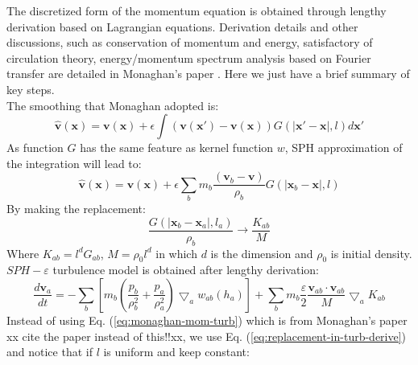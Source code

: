 \documentclass[journal abbreviation, manuscript]{copernicus}
\begin{document}
The discretized form of the momentum equation is obtained through lengthy derivation based on Lagrangian equations. Derivation details and other discussions, such as conservation of momentum and energy, satisfactory of circulation theory, energy/momentum spectrum analysis based on Fourier transfer are detailed in Monaghan's paper \citep{monaghan2011turbulence}. Here we just have a brief summary of key steps.\\
The smoothing that Monaghan adopted is:
\begin{equation}
\widehat{\textbf{v}}(\textbf{x})=\textbf{v}(\textbf{x})+ \epsilon \int (\textbf{v}(\textbf{x} \prime)-\textbf{v}(\textbf{x}))G(\vert \textbf{x} \prime - \textbf{x} \vert, l) d\textbf{x} \prime
\end{equation}
As function $G$ has the same feature as kernel function $w$, SPH approximation of the integration will lead to:
\begin{equation} \label{eq:SPH-epsilon-filtering}
\widehat{\textbf{v}}(\textbf{x})=\textbf{v}(\textbf{x})+\epsilon \sum_b m_b \dfrac{(\textbf{v}_b -\textbf{v})}{\rho _b} G(\vert \textbf{x} _b - \textbf{x} \vert, l)
\end{equation}
By making the replacement:
\begin{equation}
\label{eq:replacement-in-turb-derive}
\dfrac{G(\vert \textbf{x} _b - \textbf{x} _a \vert, l_a)}{\rho _b} \rightarrow \dfrac{K_{ab}}{M}
\end{equation}
Where $K_{ab} = l^d G_{ab}$, $M = \rho_0 l^d$ in which $d$ is the dimension and $\rho_0$ is initial density. $SPH-\varepsilon$ turbulence model is obtained after lengthy derivation:
\begin{equation}
\label{eq:monaghan-mom-turb}
\dfrac{d \textbf{v}_a}{dt} = -\sum_b [m_b (\dfrac{p_b}{\rho_b^2} + \dfrac{p_a}{\rho_a^2}) \bigtriangledown_aw_{a b}(h_a)] + \sum_b m_b \dfrac{\varepsilon}{2} \dfrac{\textbf{v}_{ab} \cdot \textbf{v}_{ab}}{M} \bigtriangledown_a K_{ab}
\end{equation}
Instead of using Eq. (\ref{eq:monaghan-mom-turb}) which is from Monaghan's paper xx cite the paper instead of this!!xx, we use Eq. (\ref{eq:replacement-in-turb-derive}) and notice that if $l$ is uniform and keep constant: 
\end{document}
